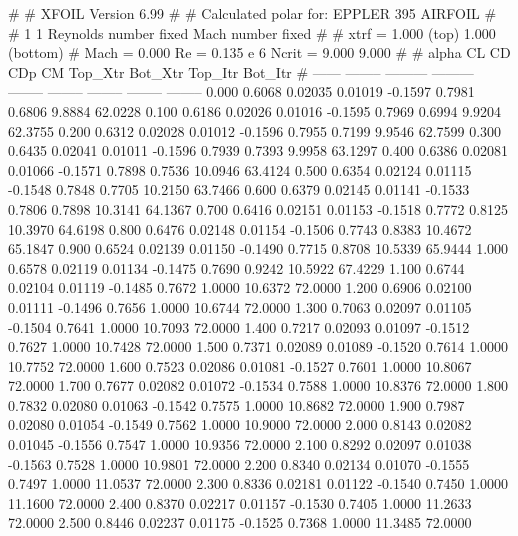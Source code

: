 #  
#       XFOIL         Version 6.99
#  
# Calculated polar for: EPPLER 395 AIRFOIL                              
#  
# 1 1 Reynolds number fixed          Mach number fixed         
#  
# xtrf =   1.000 (top)        1.000 (bottom)  
# Mach =   0.000     Re =     0.135 e 6     Ncrit =   9.000  9.000
#  
#   alpha    CL        CD       CDp       CM     Top_Xtr  Bot_Xtr  Top_Itr  Bot_Itr
#  ------ -------- --------- --------- -------- -------- -------- -------- --------
   0.000   0.6068   0.02035   0.01019  -0.1597   0.7981   0.6806   9.8884  62.0228
   0.100   0.6186   0.02026   0.01016  -0.1595   0.7969   0.6994   9.9204  62.3755
   0.200   0.6312   0.02028   0.01012  -0.1596   0.7955   0.7199   9.9546  62.7599
   0.300   0.6435   0.02041   0.01011  -0.1596   0.7939   0.7393   9.9958  63.1297
   0.400   0.6386   0.02081   0.01066  -0.1571   0.7898   0.7536  10.0946  63.4124
   0.500   0.6354   0.02124   0.01115  -0.1548   0.7848   0.7705  10.2150  63.7466
   0.600   0.6379   0.02145   0.01141  -0.1533   0.7806   0.7898  10.3141  64.1367
   0.700   0.6416   0.02151   0.01153  -0.1518   0.7772   0.8125  10.3970  64.6198
   0.800   0.6476   0.02148   0.01154  -0.1506   0.7743   0.8383  10.4672  65.1847
   0.900   0.6524   0.02139   0.01150  -0.1490   0.7715   0.8708  10.5339  65.9444
   1.000   0.6578   0.02119   0.01134  -0.1475   0.7690   0.9242  10.5922  67.4229
   1.100   0.6744   0.02104   0.01119  -0.1485   0.7672   1.0000  10.6372  72.0000
   1.200   0.6906   0.02100   0.01111  -0.1496   0.7656   1.0000  10.6744  72.0000
   1.300   0.7063   0.02097   0.01105  -0.1504   0.7641   1.0000  10.7093  72.0000
   1.400   0.7217   0.02093   0.01097  -0.1512   0.7627   1.0000  10.7428  72.0000
   1.500   0.7371   0.02089   0.01089  -0.1520   0.7614   1.0000  10.7752  72.0000
   1.600   0.7523   0.02086   0.01081  -0.1527   0.7601   1.0000  10.8067  72.0000
   1.700   0.7677   0.02082   0.01072  -0.1534   0.7588   1.0000  10.8376  72.0000
   1.800   0.7832   0.02080   0.01063  -0.1542   0.7575   1.0000  10.8682  72.0000
   1.900   0.7987   0.02080   0.01054  -0.1549   0.7562   1.0000  10.9000  72.0000
   2.000   0.8143   0.02082   0.01045  -0.1556   0.7547   1.0000  10.9356  72.0000
   2.100   0.8292   0.02097   0.01038  -0.1563   0.7528   1.0000  10.9801  72.0000
   2.200   0.8340   0.02134   0.01070  -0.1555   0.7497   1.0000  11.0537  72.0000
   2.300   0.8336   0.02181   0.01122  -0.1540   0.7450   1.0000  11.1600  72.0000
   2.400   0.8370   0.02217   0.01157  -0.1530   0.7405   1.0000  11.2633  72.0000
   2.500   0.8446   0.02237   0.01175  -0.1525   0.7368   1.0000  11.3485  72.0000
